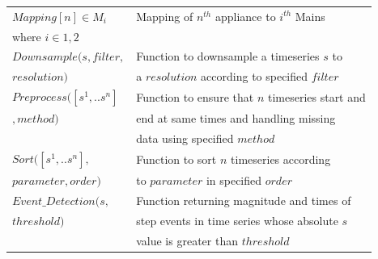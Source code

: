 \documentclass[conference]{IEEEtran}
\begin{document}
\begin{table}
\begin{tabular}{|l|l|}
\hline
$Mapping[n] \in {M_i}$ & Mapping of $n^{th}$ appliance to $i^{th}$ Mains\\[0.1cm]
where $i \in {1,2}$ & \\
\hline
\hline
\hline
$Downsample(s,filter,$ & Function to downsample a timeseries $s$ to\\[0.1cm]
$resolution)$                                        & a $resolution$ according to specified $filter$\\[0.1cm]
\hline
$Preprocess([s^1,..s^n]$ & Function to ensure that $n$ timeseries start and\\[0.1cm]
$,method)$                                        &end at same times and handling missing\\[0.1cm]
                                        & data using specified $method$\\[0.1cm]
\hline                                        
$Sort([s^1,..s^n],$ & Function to sort $n$ timeseries according\\[0.1cm]
$parameter,order)$  &to $parameter$ in specified $order$\\[0.1cm]
\hline
$Event\_Detection(s,$ & Function returning magnitude and times of \\[0.1cm]
$threshold)$                  &step events in time series whose absolute $s$ \\[0.1cm]
                             & value is greater than $threshold$\\[0.1cm]
                                                                               

\hline
%
\end{tabular}
\end{table}
\end{document}
